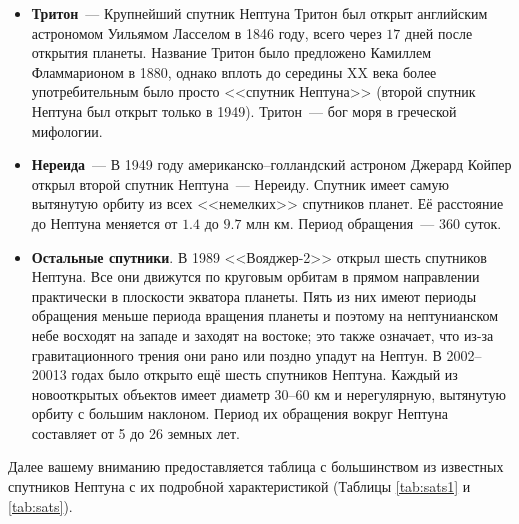 \documentclass[12pt]{article}
\numberwithin{equation}{section} %
\theoremstyle{definition}\newtheorem{defi}{Определение}
\begin{document}
\begin{itemize}
  \item \textbf{Тритон}~--- Крупнейший спутник Нептуна Тритон был открыт английским астрономом Уильямом Ласселом в 1846 году, всего через $17$ дней после открытия планеты. Название Тритон было предложено Камиллем Фламмарионом в 1880, однако вплоть до середины XX века более употребительным было просто <<спутник Нептуна>> (второй спутник Нептуна был открыт только в 1949). Тритон~--- бог моря в греческой мифологии.
  \item \textbf{Нереида}~--- В 1949 году американско--голландский астроном Джерард Койпер открыл второй спутник Нептуна~--- Нереиду. Спутник имеет самую вытянутую орбиту из всех <<немелких>> спутников планет. Её расстояние до Нептуна меняется от $1.4$ до $9.7$ млн км. Период обращения~--- $360$ суток.
  \item \textbf{Остальные спутники}. В 1989 <<Вояджер-2>> открыл шесть спутников Нептуна. Все они движутся по круговым орбитам в прямом направлении практически в плоскости экватора планеты. Пять из них имеют периоды обращения меньше периода вращения планеты и поэтому на нептунианском небе восходят на западе и заходят на востоке; это также означает, что из-за гравитационного трения они рано или поздно упадут на Нептун. В 2002--20013 годах было открыто ещё шесть спутников Нептуна. Каждый из новооткрытых объектов имеет диаметр $30$--$60$ км и нерегулярную, вытянутую орбиту с большим наклоном. Период их обращения вокруг Нептуна составляет от 5 до 26 земных лет.
\end{itemize}

Далее вашему вниманию предоставляется таблица с большинством из известных спутников Нептуна с их подробной характеристикой (Таблицы \ref{tab:sats1} и \ref{tab:sats}).
\end{document}
